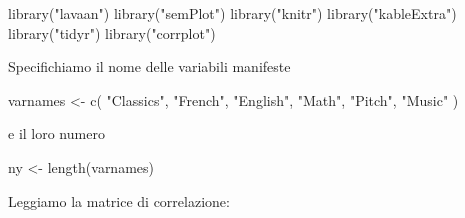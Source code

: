 \documentclass[
  11pt,
]{krantz}
\makeatletter
\newenvironment{Shaded}{\begin{snugshade}}{\end{snugshade}}
\newcommand{\FunctionTok}[1]{\textcolor[rgb]{0,0,0}{#1}}
\newcommand{\NormalTok}[1]{#1}
\newcommand{\OtherTok}[1]{\textcolor[rgb]{0.37,0.37,0.37}{#1}}
\newcommand{\StringTok}[1]{\textcolor[rgb]{0.5,0.5,0.5}{#1}}
\newenvironment{kframe}{%
\medskip{}
\setlength{\fboxsep}{.8em}
 \def\at@end@of@kframe{}%
 \ifinner\ifhmode%
  \def\at@end@of@kframe{\end{minipage}}%
  \begin{minipage}{\columnwidth}%
 \fi\fi%
 \def\FrameCommand##1{\hskip\@totalleftmargin \hskip-\fboxsep
 \colorbox{shadecolor}{##1}\hskip-\fboxsep
     \hskip-\linewidth \hskip-\@totalleftmargin \hskip\columnwidth}%
 \MakeFramed {\advance\hsize-\width
   \@totalleftmargin\z@ \linewidth\hsize
   \@setminipage}}%
 {\par\unskip\endMakeFramed%
 \at@end@of@kframe}
\renewenvironment{Shaded}{\begin{kframe}}{\end{kframe}}
\theoremstyle{definition}
\theoremstyle{definition}
\theoremstyle{definition}
\theoremstyle{definition}
\theoremstyle{remark}
\makeatother
\begin{document}
\begin{Shaded}
\begin{Highlighting}[]
\FunctionTok{library}\NormalTok{(}\StringTok{"lavaan"}\NormalTok{)}
\FunctionTok{library}\NormalTok{(}\StringTok{"semPlot"}\NormalTok{)}
\FunctionTok{library}\NormalTok{(}\StringTok{"knitr"}\NormalTok{)}
\FunctionTok{library}\NormalTok{(}\StringTok{"kableExtra"}\NormalTok{)}
\FunctionTok{library}\NormalTok{(}\StringTok{"tidyr"}\NormalTok{)}
\FunctionTok{library}\NormalTok{(}\StringTok{"corrplot"}\NormalTok{)}
\end{Highlighting}
\end{Shaded}

Specifichiamo il nome delle variabili manifeste

\begin{Shaded}
\begin{Highlighting}[]
\NormalTok{varnames }\OtherTok{\textless{}{-}} \FunctionTok{c}\NormalTok{(}
  \StringTok{"Classics"}\NormalTok{, }\StringTok{"French"}\NormalTok{, }\StringTok{"English"}\NormalTok{, }\StringTok{"Math"}\NormalTok{, }\StringTok{"Pitch"}\NormalTok{, }\StringTok{"Music"}
\NormalTok{)}
\end{Highlighting}
\end{Shaded}

e il loro numero

\begin{Shaded}
\begin{Highlighting}[]
\NormalTok{ny }\OtherTok{\textless{}{-}} \FunctionTok{length}\NormalTok{(varnames)}
\end{Highlighting}
\end{Shaded}

Leggiamo la matrice di correlazione:
\end{document}
